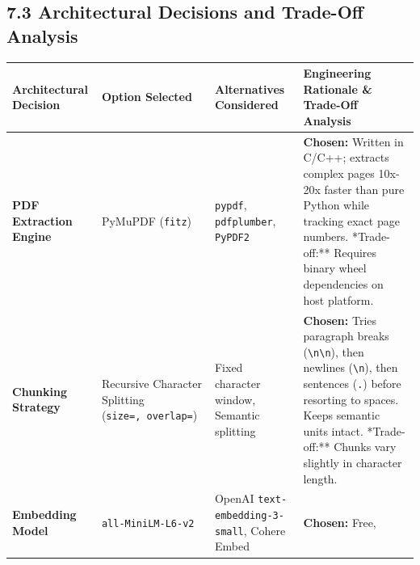 \documentclass[
]{article}
\begin{document}
\subsection{7.3 Architectural Decisions and Trade-Off
Analysis}\label{architectural-decisions-and-trade-off-analysis}

\begingroup\footnotesize
\begin{longtable}[]{@{}
  >{\raggedright\arraybackslash\sloppy}p{}
  >{\raggedright\arraybackslash\sloppy}p{}
  >{\raggedright\arraybackslash\sloppy}p{}
  >{\raggedright\arraybackslash\sloppy}p{}@{}}
\toprule\noalign{}
\begin{minipage}[b]{\linewidth}\raggedright
Architectural Decision
\end{minipage} & \begin{minipage}[b]{\linewidth}\raggedright
Option Selected
\end{minipage} & \begin{minipage}[b]{\linewidth}\raggedright
Alternatives Considered
\end{minipage} & \begin{minipage}[b]{\linewidth}\raggedright
Engineering Rationale \& Trade-Off Analysis
\end{minipage} \\
\midrule\noalign{}
\endhead
\bottomrule\noalign{}
\endlastfoot
\textbf{PDF Extraction Engine} & PyMuPDF (\texttt{fitz}) &
\texttt{pypdf}, \texttt{pdfplumber}, \texttt{PyPDF2} & \textbf{Chosen:}
Written in C/C++; extracts complex pages 10x-20x faster than pure Python
while tracking exact page numbers. \newline **Trade-off:** Requires
binary wheel dependencies on host platform. \\
\textbf{Chunking Strategy} & Recursive Character Splitting
(\texttt{size=\allowbreak 500,\allowbreak \ \allowbreak overlap=\allowbreak 50}) & Fixed character window, Semantic
splitting & \textbf{Chosen:} Tries paragraph breaks
(\texttt{\textbackslash{}n\textbackslash{}n}), then newlines
(\texttt{\textbackslash{}n}), then sentences (\texttt{.}) before
resorting to spaces. Keeps semantic units intact.
\newline **Trade-off:** Chunks vary slightly in character length. \\
\textbf{Embedding Model} & \texttt{all-MiniLM-L6-v2} & OpenAI
\texttt{text-embedding-3-small}, Cohere Embed & \textbf{Chosen:} Free,

\end{longtable}
\end{document}
